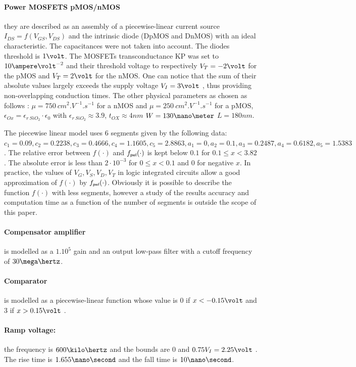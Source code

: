 \paragraph{Power MOSFETS pMOS/nMOS} they are described as an assembly of a
piecewise-linear current source $I_{DS} = f(V_{GS}, V_{DS})$ and the intrinsic diode
(DpMOS and DnMOS) with an ideal characteristic.
The capacitances were not taken into account. The diodes threshold is
$1\volt$. 
The MOSFETs transconductance KP was set to $10 \ampere\volt^{-2}$ and
their threshold voltage to respectively $V_T = -2 \volt$ for the pMOS and $V_T= 2 \volt$ for
the nMOS. One can notice that the sum of their absolute values largely
exceeds the supply voltage $V_{I} = 3 \volt$ , thus providing non-overlapping
conduction times. The other physical parameters as chosen as follows : $\mu = 750~cm^2.V^{-1}.s^{-1}$ for a nMOS and $\mu=250~cm^2.V^{-1}.s^{-1}$ for a pMOS, $\epsilon_{Ox} = \epsilon_{r~SiO_2} \cdot \epsilon_0$ with $\epsilon_{r~SiO_2} \approx 3.9$, $t_{OX} \approx 4 nm$ $W = 130\nano \meter$ $L=180 nm$. 

The piecewise linear model uses $6$ segments given by the following data:$ c_1 = 0.09 , c_2=0.2238 , c_3=0.4666 , c_4=1.1605 , c_5=2.8863,  a_1 = 0 , a_2=0.1, a_3=0.2487 , a_4=0.6182 , a_5=1.5383$. The relative error between $f(\cdot)$ and $f_\pwl(\cdot)$ is kept below $0.1$ for $0.1 \leq x < 3.82$. The absolute error is less than $2 \cdot 10^{-3}$ for $0 \leq x < 0.1$ and $0$ for negative $x$. In practice, the values of $V_G,V_S,V_D,V_T$ in logic integrated circuits allow  a good approximation of $f(\cdot)$ by $f_\pwl(\cdot)$. Obviously it is possible to describe the function $f(\cdot)$ with less segments, however a study of the results accuracy and computation time as a function of the number of segments is outside the scope of this paper. 


\paragraph{Compensator amplifier} is modelled as a $1.10^5$ gain and an output low-pass
filter with a cutoff frequency of $30 \mega\hertz$.
\paragraph{Comparator} is modelled as a piecewise-linear function whose value is $0$ if
$x < -0.15\volt$ and 3 if $x > 0.15\volt$ .
\paragraph{Ramp voltage:} the frequency is $600 \kilo\hertz$ and the bounds are $0$ and $0.75 V_I = 2.25 \volt$ .
The rise time is $1.655 \nano\second$ and the fall time is $10 \nano\second$.

